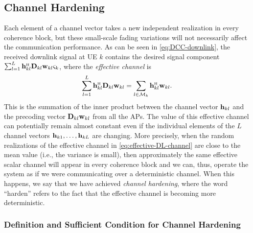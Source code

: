 \subsection{Channel Hardening}
\label{subsec-channel-hardening}

Each element of a channel vector takes a new independent realization in every coherence block, but these small-scale fading variations will not necessarily affect the communication performance. As can be seen in \eqref{eq:DCC-downlink}, the received downlink signal at  \gls{UE} $k$ contains the desired signal component $\sum_{l=1}^{L}  \vect{h}_{kl}^{\Htran} \vect{D}_{kl}  \vect{w}_{kl} \varsigma_k$, where the \emph{effective channel} is
\begin{equation} \label{eq:effective-DL-channel}
\sum_{l=1}^{L}  \vect{h}_{kl}^{\Htran} \vect{D}_{kl}  \vect{w}_{kl} = \sum_{l \in \mathcal{M}_k}  \vect{h}_{kl}^{\Htran}  \vect{w}_{kl}.
\end{equation}
This is the summation of the inner product between the channel vector $\mathbf{h}_{kl}$ and the precoding vector $\mathbf{D}_{kl} \mathbf{w}_{kl}$ from all the APs.
The value of this effective channel can potentially remain almost constant even if the individual elements of the $L$ channel vectors $ \mathbf{h}_{k1},\ldots, \mathbf{h}_{kL}$ are changing.
More precisely, when the random realizations of the effective channel in \eqref{eq:effective-DL-channel} are close to the mean value (i.e., the variance is small), then approximately the same effective scalar channel will appear in every coherence block and we can, thus, operate the system as if we were communicating over a deterministic channel.
When this happens, we say that we have achieved \emph{channel hardening}, where the word ``harden'' refers to the fact that the effective channel is becoming more deterministic.

\subsubsection{Definition and Sufficient Condition for Channel Hardening}

